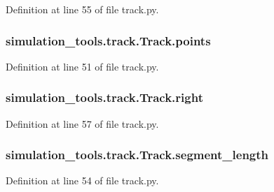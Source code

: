 Definition at line 55 of file track.\+py.

\subsubsection[{\texorpdfstring{points}{points}}]{\setlength{\rightskip}{0pt plus 5cm}simulation\+\_\+tools.\+track.\+Track.\+points}\hypertarget{classsimulation__tools_1_1track_1_1_track_ac6de34747fd382897e7f790cd9faf67c}{}\label{classsimulation__tools_1_1track_1_1_track_ac6de34747fd382897e7f790cd9faf67c}


Definition at line 51 of file track.\+py.

\subsubsection[{\texorpdfstring{right}{right}}]{\setlength{\rightskip}{0pt plus 5cm}simulation\+\_\+tools.\+track.\+Track.\+right}\hypertarget{classsimulation__tools_1_1track_1_1_track_a668e3804fa2720790fb57f592c73c782}{}\label{classsimulation__tools_1_1track_1_1_track_a668e3804fa2720790fb57f592c73c782}


Definition at line 57 of file track.\+py.

\subsubsection[{\texorpdfstring{segment\+\_\+length}{segment_length}}]{\setlength{\rightskip}{0pt plus 5cm}simulation\+\_\+tools.\+track.\+Track.\+segment\+\_\+length}\hypertarget{classsimulation__tools_1_1track_1_1_track_aa74dadec286ae8ad2f3399c6fd9e9fd9}{}\label{classsimulation__tools_1_1track_1_1_track_aa74dadec286ae8ad2f3399c6fd9e9fd9}


Definition at line 54 of file track.\+py.

